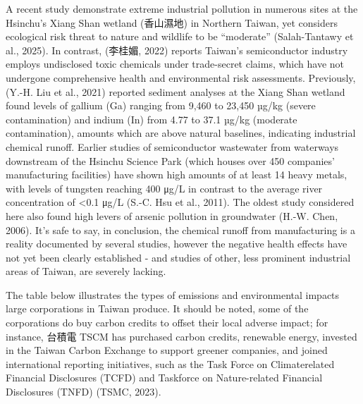 \documentclass[
  12pt,
  letterpaper,
  DIV=11,
  numbers=noendperiod]{scrartcl}
\begin{document}
A recent study demonstrate extreme industrial pollution in numerous
sites at the Hsinchu's Xiang Shan wetland (香山濕地) in Northern Taiwan,
yet considers ecological risk threat to nature and wildlife to be
``moderate'' (Salah-Tantawy et al., 2025). In contrast, (李桂媚, 2022)
reports Taiwan's semiconductor industry employs undisclosed toxic
chemicals under trade-secret claims, which have not undergone
comprehensive health and environmental risk assessments. Previously,
(Y.-H. Liu et al., 2021) reported sediment analyses at the Xiang Shan
wetland found levels of gallium (Ga) ranging from 9,460 to 23,450 µg/kg
(severe contamination) and indium (In) from 4.77 to 37.1 µg/kg (moderate
contamination), amounts which are above natural baselines, indicating
industrial chemical runoff. Earlier studies of semiconductor wastewater
from waterways downstream of the Hsinchu Science Park (which houses over
450 companies' manufacturing facilities) have shown high amounts of at
least 14 heavy metals, with levels of tungsten reaching 400 μg/L in
contrast to the average river concentration of \textless0.1 μg/L (S.-C.
Hsu et al., 2011). The oldest study considered here also found high
levers of arsenic pollution in groundwater (H.-W. Chen, 2006). It's safe
to say, in conclusion, the chemical runoff from manufacturing is a
reality documented by several studies, however the negative health
effects have not yet been clearly established - and studies of other,
less prominent industrial areas of Taiwan, are severely lacking.

The table below illustrates the types of emissions and environmental
impacts large corporations in Taiwan produce. It should be noted, some
of the corporations do buy carbon credits to offset their local adverse
impact; for instance, 台積電 TSCM has purchased carbon credits,
renewable energy, invested in the Taiwan Carbon Exchange to support
greener companies, and joined international reporting initiatives, such
as the Task Force on Climaterelated Financial Disclosures (TCFD) and
Taskforce on Nature-related Financial Disclosures (TNFD) (TSMC, 2023).

\def\pandoctableshortcapt{Large Industrial Polluters in Taiwan}
\end{document}
